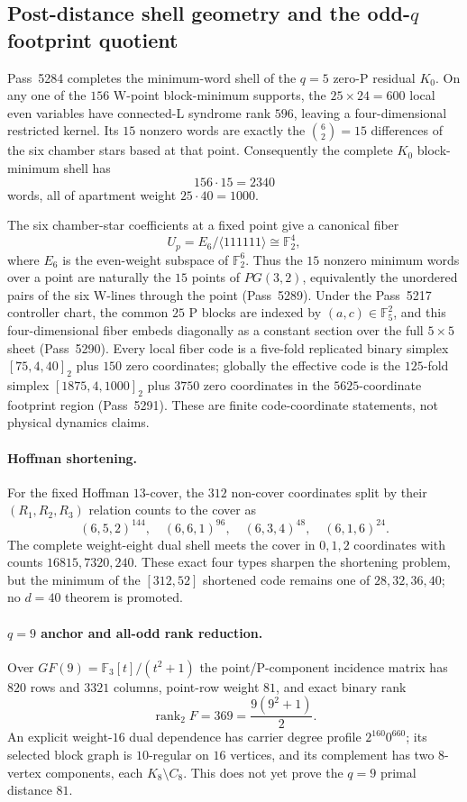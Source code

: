\subsection{Post-distance shell geometry and the odd-$q$ footprint quotient}
Pass~5284 completes the minimum-word shell of the $q=5$ zero-P residual $K_0$.
On any one of the $156$ W-point block-minimum supports, the $25\times24=600$
local even variables have connected-L syndrome rank $596$, leaving a
four-dimensional restricted kernel.  Its $15$ nonzero words are exactly the
$\binom62=15$ differences of the six chamber stars based at that point.
Consequently the complete $K_0$ block-minimum shell has
\[
  156\cdot15=2340
\]
words, all of apartment weight $25\cdot40=1000$.

The six chamber-star coefficients at a fixed point give a canonical fiber
\[
  U_p=E_6/\langle111111\rangle\cong\mathbb F_2^4,
\]
where $E_6$ is the even-weight subspace of $\mathbb F_2^6$.  Thus the $15$
nonzero minimum words over a point are naturally the $15$ points of
$PG(3,2)$, equivalently the unordered pairs of the six W-lines through the
point (Pass~5289).  Under the Pass~5217 controller chart, the common $25$ P
blocks are indexed by $(a,c)\in\mathbb F_5^2$, and this four-dimensional fiber
embeds diagonally as a constant section over the full $5\times5$ sheet
(Pass~5290).  Every local fiber code is a five-fold replicated binary simplex
$[75,4,40]_2$ plus $150$ zero coordinates; globally the effective code is the
$125$-fold simplex $[1875,4,1000]_2$ plus $3750$ zero coordinates in the
$5625$-coordinate footprint region (Pass~5291).  These are finite code-coordinate
statements, not physical dynamics claims.

\paragraph{Hoffman shortening.}
For the fixed Hoffman $13$-cover, the $312$ non-cover coordinates split by their
$(R_1,R_2,R_3)$ relation counts to the cover as
\[
 (6,5,2)^{144},\quad(6,6,1)^{96},\quad(6,3,4)^{48},\quad(6,1,6)^{24}.
\]
The complete weight-eight dual shell meets the cover in $0,1,2$ coordinates with
counts $16815,7320,240$.  These exact four types sharpen the shortening problem,
but the minimum of the $[312,52]$ shortened code remains one of
$28,32,36,40$; no $d=40$ theorem is promoted.

\paragraph{$q=9$ anchor and all-odd rank reduction.}
Over $GF(9)=\mathbb F_3[t]/(t^2+1)$ the point/P-component incidence matrix has
$820$ rows and $3321$ columns, point-row weight $81$, and exact binary rank
\[
  \operatorname{rank}_2 F=369=\frac{9(9^2+1)}2.
\]
An explicit weight-$16$ dual dependence has carrier degree profile
$2^{160}0^{660}$; its selected block graph is $10$-regular on $16$ vertices,
and its complement has two $8$-vertex components, each $K_8\setminus C_8$.
This does not yet prove the $q=9$ primal distance $81$.

